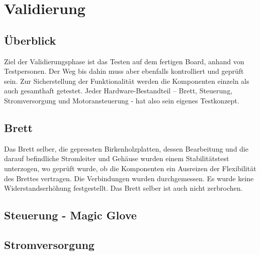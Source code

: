 \chapter{Validierung} \label{Validierung}

\section{Überblick} \label{ValidUeberblick}
Ziel der Validierungsphase ist das Testen auf dem fertigen Board, anhand von Testpersonen. Der Weg bis dahin muss aber ebenfalls kontrolliert und geprüft sein. Zur Sicherstellung der Funktionalität werden die Komponenten einzeln als auch gesamthaft getestet. 
Jeder Hardware-Bestandteil – Brett, Steuerung, Stromversorgung und Motoransteuerung - hat also sein eigenes Testkonzept.

\section{Brett} \label{ValidBrett}
Das Brett selber, die gepressten Birkenholzplatten, dessen Bearbeitung und die darauf befindliche Stromleiter und Gehäuse wurden einem Stabilitätstest unterzogen, wo geprüft wurde, ob die Komponenten ein Ausreizen der Flexibilität des Brettes vertragen. Die Verbindungen wurden durchgemessen. Es wurde keine Widerstandserhöhung festgestellt. Das Brett selber ist auch nicht zerbrochen.

\section{Steuerung - Magic Glove} \label{ValidSteuerMagicGlove}

\section{Stromversorgung} \label{ValidStromversorgung}

